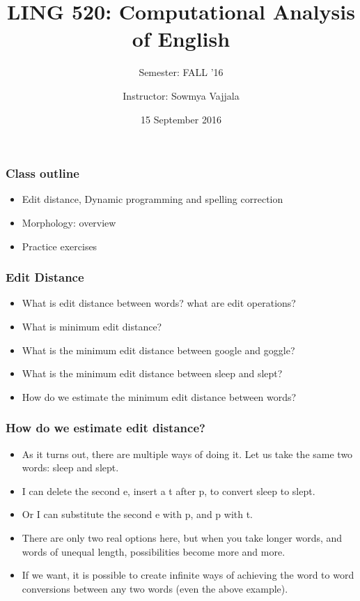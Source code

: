 \documentclass{beamer}
\author[Sowmya Vajjala]{Instructor: Sowmya Vajjala}
\title[LING 520]{LING 520: Computational Analysis of English}
\subtitle{Semester: FALL '16}
\date{15 September 2016}
\institute{Iowa State University, USA}
\begin{document}
\begin{frame}\titlepage
\end{frame}

\begin{frame}
\frametitle{Class outline}
\begin{itemize}
\item Edit distance, Dynamic programming and spelling correction
\item Morphology: overview
\item Practice exercises
\end{itemize}
\end{frame}

\begin{frame}
\frametitle{Edit Distance}
\begin{itemize}
\item What is edit distance between words? what are edit operations? \pause
\item What is minimum edit distance? \pause
\item What is the minimum edit distance between google and goggle? \pause %
\item What is the minimum edit distance between sleep and slept? \pause
\item How do we estimate the minimum edit distance between words? 
\end{itemize}
\end{frame}

\begin{frame}
\frametitle{How do we estimate edit distance?}
\begin{itemize}
\item As it turns out, there are multiple ways of doing it. Let us take the same two words: sleep and slept.
\item I can delete the second e, insert a t after p, to convert sleep to slept. \pause
\item Or I can substitute the second e with p, and p with t. \pause
\item There are only two real options here, but when you take longer words, and words of unequal length, possibilities become more and more. \pause
\item If we want, it is possible to create infinite ways of achieving the word to word conversions between any two words (even the above example). 
\end{itemize}
\end{frame}
\end{document}

